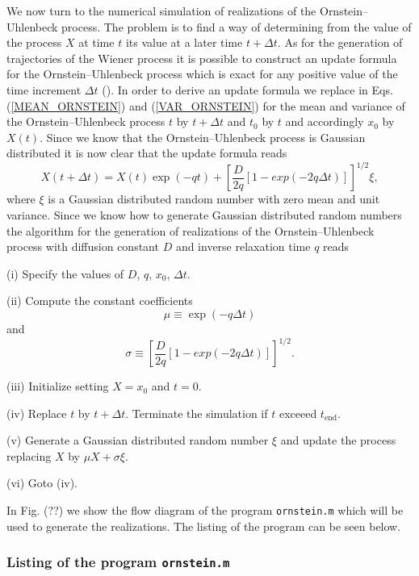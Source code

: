 We now turn to the numerical simulation of realizations of the 
Ornstein--Uhlenbeck process. The problem is to find a way of
determining  from the value of the process $X$ at time $t$
its value at a later time $t+\Delta t$. As for the generation of 
trajectories of the Wiener process it is possible to construct
an update formula for the Ornstein--Uhlenbeck process which is 
exact for any positive value of the time increment $\Delta t$
(\cite{GILLESPIE96}). In order to derive an update formula we
replace in Eqs. (\ref{MEAN_ORNSTEIN}) and (\ref{VAR_ORNSTEIN})
for the mean and variance of the Ornstein--Uhlenbeck process
$t$ by $t+\Delta t$ and $t_0$ by $t$ and accordingly $x_0$ by
$X(t)$. Since we know that the Ornstein--Uhlenbeck process
is Gaussian distributed it is now clear that the update
formula reads
\begin{equation}
X(t+\Delta t) = X(t) \exp(-qt) 
+ \left[ \frac{D}{2q} [1-exp(-2q\Delta t)] \right]^{1/2} \xi,
\end{equation}
where $\xi$ is a Gaussian distributed random number with zero 
mean and unit variance. Since we know how to generate Gaussian 
distributed random numbers the algorithm for the generation of 
realizations of the Ornstein--Uhlenbeck process with diffusion constant
$D$ and inverse relaxation time $q$ reads

(i) Specify the values of $D$, $q$, $x_0$, $\Delta t$.

(ii) Compute the constant coefficients 
\begin{equation*}
\mu \equiv \exp(-q \Delta t)
\end{equation*}
and
\begin{equation*}
\sigma \equiv \left[ \frac{D}{2q} [1-exp(-2q\Delta t)] 
\right]^{1/2}.
\end{equation*}

(iii) Initialize setting $X=x_0$ and $t=0$.

(iv) Replace $t$ by $t+\Delta t$. Terminate the simulation if $t$
exceeed $t_{\text{end}}$.

(v) Generate a Gaussian distributed random number $\xi$ and 
update the process replacing $X$ by $\mu X + \sigma \xi$.

(vi) Goto (iv).

In Fig. (??) we show the flow diagram of the program 
\texttt{ornstein.m} which will be used to generate the 
realizations. The listing of the program can be seen below.

\subsubsection{Listing of the program \texttt{ornstein.m}}

